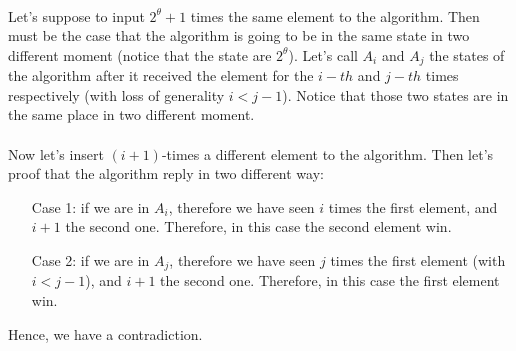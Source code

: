 \documentclass[a4paper]{article}
\begin{document}
\\
Let's suppose to input $2^{\theta}+1$ times the same element to the algorithm. Then must be the case that the algorithm is going to be in the same state in two different moment (notice that the state are $2^{\theta}$). Let's call $A_i$ and $A_j$ the states of the algorithm after it received the element for the $i-th$ and $j-th$ times respectively (with loss of generality $i < j-1$). Notice that those two states are in the same place in two different moment.
\\
\\
Now let's insert $(i+1)$-times a different element to the algorithm. Then let's proof that the algorithm reply in two different way:
\begin{itemize}
\item[Case 1:] if we are in $A_i$, therefore we have seen $i$ times the first element, and $i+1$ the second one. Therefore, in this case the second element win.  
\item[Case 2:] if we are in $A_j$, therefore we have seen $j$ times the first element (with $i < j-1$), and $i+1$ the second one. Therefore, in this case the first element win. 
\end{itemize}
Hence, we have a contradiction.
\end{document}
